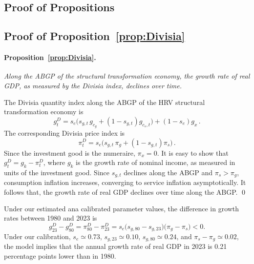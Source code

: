 \documentclass[12pt,a4paper]{article}
\newcommand{\red}[1]{\textcolor{red}{#1}} %
\begin{document}
\appendix
\begin{appendices}

\section{Proof of Propositions}

\subsection{Proof of Proposition~\ref{prop:Divisia}}\label{app:Divisia2}

\paragraph{Proposition~\ref{prop:Divisia}.}
\textit{Along the ABGP of the structural transformation economy, the growth rate of real GDP, as measured by the Divisia index, declines over time.}

The Divisia quantity index along the ABGP of the HRV structural transformation economy is
\[
g^D_t = s_{e} \big( s_{g,t}\, g_{c_g} + (1 - s_{g,t}) g_{c_s,t} \big) + (1 - s_{e}) g_{x} \, .
\]
The corresponding Divisia price index is
\[
\pi^D_t = s_{e} \big( s_{g,t}\, \pi_g + (1 - s_{g,t}) \pi_{s} \big) \, .
\]
Since the investment good is the numeraire, $\pi_x = 0$.
It is easy to show that $g^D_t  = g_k - \pi^D_t$, where $g_k$ is the growth rate of nominal income, as measured in units of the investment good. 
Since $s_{g,t}$ declines along the ABGP and $\pi_s > \pi_g$, consumption inflation increases, converging to service inflation asymptotically. It follows that, the growth rate of real GDP declines over time along the ABGP. \qed

\quad
Under our estimated ana calibrated parameter values, the difference in growth rates between 1980 and 2023 is
\[
g^{D}_{23} - g^{D}_{80}= \pi^{D}_{80} - \pi^{D}_{23} = s_e \big(s_{g,80} - s_{g, 23}\big) \big(\pi_g - \pi_s\big) < 0 .
\]
Under our calibration, $s_e \simeq 0.73$, $s_{g,23} \simeq 0.10$, $s_{g,80} \simeq 0.24$, and $\pi_s - \pi_g \simeq 0.02$, the model implies that the annual growth rate of real GDP in 2023 is 0.21 percentage points lower than in 1980.

\end{appendices}
\end{document}

